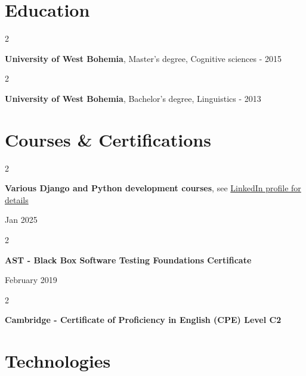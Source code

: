 \documentclass[10pt, a4paper]{article}
\newenvironment{twocolentry}[2][]{
    \onecolentry
    \def\secondColumn{#2}
    \setcolumnwidth{\fill, 4.5 cm}
    \begin{paracol}{2}
}{
    \switchcolumn \raggedleft \secondColumn
    \end{paracol}
    \endonecolentry
} %
\let\hrefWithoutArrow\href
\begin{document}
    \section{Education}

        \begin{twocolentry}{
            2013 - 2015
        }
            \textbf{University of West Bohemia}, Master's degree, Cognitive sciences\end{twocolentry}

        \vspace{0.10 cm}

        \begin{twocolentry}{
            2009 - 2013
        }
            \textbf{University of West Bohemia}, Bachelor's degree, Linguistics\end{twocolentry}

    \vspace{0.2 cm}

    \section{Courses \& Certifications}

        \begin{twocolentry}{
            Jan 2025
        }
            \textbf{Various Django and Python development courses}, see \hrefWithoutArrow{https://www.linkedin.com/in/dusanhaustein/details/certifications/}{LinkedIn profile for details}
        \end{twocolentry}

        \vspace{0.10 cm}

        \begin{twocolentry}{
            February 2019
        }
            \textbf{AST - Black Box Software Testing Foundations Certificate}
        \end{twocolentry}

        \vspace{0.10 cm}

        \begin{twocolentry}{
            2015
        }
            \textbf{Cambridge - Certificate of Proficiency in English (CPE) Level C2}
        \end{twocolentry}

        \vspace{0.2 cm}

    \section{Technologies}
\end{document}
